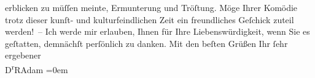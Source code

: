 \begin{ledgroupsized}[t]{13cm}
               erblicken zu müſſen meinte, Ermunterung und Tröſtung.\pend
           \pstart
           Möge Ihrer Komödie trotz
               dieser kunſt- und kulturfeindlichen Zeit ein freundliches Geſchick zuteil
               werden! –\pend
           \pstart
           Ich werde mir erlauben, Ihnen für Ihre Liebenswürdigkeit, wenn Sie es geſtatten,
               demnächſt perſönlich zu danken.\pend
           \pstart
           Mit den beſten Grüßen Ihr ſehr ergebener{\\[\baselineskip]}\spacefill\mbox{D\textsuperscript{r}RAdam}\pend
           \leftskip=0em{}
         
         \endnumbering{}\end{ledgroupsized}  \newcommand{\dateiname}{L02220}\newcommand{\titel}{Robert Adam an Arthur Schnitzler, 21. 10. 1915}\newcommand{\editorInnen}{Martin Anton Müller und Gerd-Hermann Susen}
      